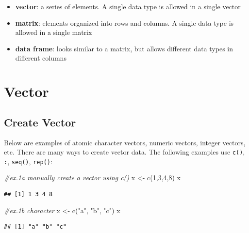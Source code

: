\documentclass[
]{book}
\newenvironment{Shaded}{\begin{snugshade}}{\end{snugshade}}
\newcommand{\CommentTok}[1]{\textcolor[rgb]{0.56,0.35,0.01}{\textit{#1}}}
\newcommand{\DecValTok}[1]{\textcolor[rgb]{0.00,0.00,0.81}{#1}}
\newcommand{\FunctionTok}[1]{\textcolor[rgb]{0.00,0.00,0.00}{#1}}
\newcommand{\NormalTok}[1]{#1}
\newcommand{\OtherTok}[1]{\textcolor[rgb]{0.56,0.35,0.01}{#1}}
\newcommand{\StringTok}[1]{\textcolor[rgb]{0.31,0.60,0.02}{#1}}
\providecommand{\tightlist}{%
  \setlength{\itemsep}{0pt}\setlength{\parskip}{0pt}}
\begin{document}
\begin{itemize}
\tightlist
\item
  \textbf{vector}: a series of elements. A single data type is allowed in a single vector
\item
  \textbf{matrix}: elements organized into rows and columns. A single data type is allowed in a single matrix
\item
  \textbf{data frame}: looks similar to a matrix, but allows different data types in different columns
\end{itemize}

\hypertarget{vector}{%
\section{Vector}\label{vector}}

\hypertarget{create-vector}{%
\subsection{Create Vector}\label{create-vector}}

Below are examples of atomic character vectors, numeric vectors, integer vectors, etc. There are many ways to create vector data. The following examples use \texttt{c()}, \texttt{:}, \texttt{seq()}, \texttt{rep()}:

\begin{Shaded}
\begin{Highlighting}[]
\CommentTok{\#ex.1a manually create a vector using c()}
\NormalTok{x }\OtherTok{\textless{}{-}} \FunctionTok{c}\NormalTok{(}\DecValTok{1}\NormalTok{,}\DecValTok{3}\NormalTok{,}\DecValTok{4}\NormalTok{,}\DecValTok{8}\NormalTok{)}
\NormalTok{x}
\end{Highlighting}
\end{Shaded}

\begin{verbatim}
## [1] 1 3 4 8
\end{verbatim}

\begin{Shaded}
\begin{Highlighting}[]
\CommentTok{\#ex.1b character}
\NormalTok{x }\OtherTok{\textless{}{-}} \FunctionTok{c}\NormalTok{(}\StringTok{"a"}\NormalTok{, }\StringTok{"b"}\NormalTok{, }\StringTok{"c"}\NormalTok{)}
\NormalTok{x}
\end{Highlighting}
\end{Shaded}

\begin{verbatim}
## [1] "a" "b" "c"
\end{verbatim}
\end{document}
